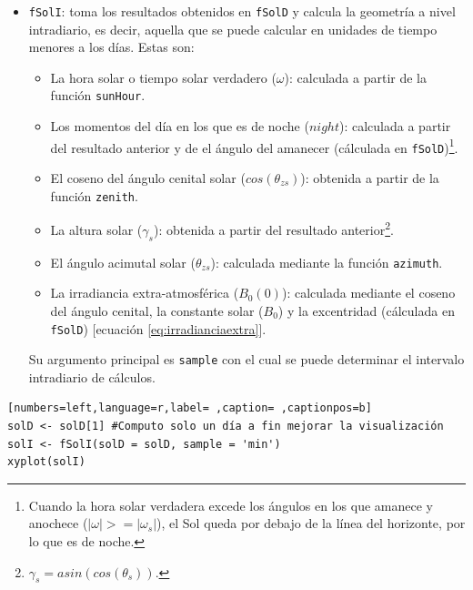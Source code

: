 \begin{itemize}
\item \texttt{fSolI}: toma los resultados obtenidos en \texttt{fSolD} y calcula la geometría a nivel intradiario, es decir, aquella que se puede calcular en unidades de tiempo menores a los días.
Estas son:
\begin{itemize}
\item La hora solar o tiempo solar verdadero (\(\omega\)): calculada a partir de la función \texttt{sunHour}.
\item Los momentos del día en los que es de noche (\(night\)): calculada a partir del resultado anterior y de el ángulo del amanecer (cálculada en \texttt{fSolD})\footnote{Cuando la hora solar verdadera excede los ángulos en los que amanece y anochece (\(|\omega|>=|\omega_s|\)), el Sol queda por debajo de la línea del horizonte, por lo que es de noche.}.
\item El coseno del ángulo cenital solar (\(cos(\theta_{zs})\)): obtenida a partir de la función \texttt{zenith}.
\item La altura solar (\(\gamma_s\)): obtenida a partir del resultado anterior\footnote{\(\gamma_s=asin(cos(\theta_s))\).}.
\item El ángulo acimutal solar (\(\theta_{zs}\)): calculada mediante la función \texttt{azimuth}.
\item La irradiancia extra-atmosférica (\(B_0(0)\)): calculada mediante el coseno del ángulo cenital, la constante solar (\(B_0\)) y la excentridad (cálculada en \texttt{fSolD}) [ecuación \ref{eq:irradianciaextra}].
\end{itemize}
Su argumento principal es \texttt{sample} con el cual se puede determinar el intervalo intradiario de cálculos.
\end{itemize}
\begin{lstlisting}[numbers=left,language=r,label= ,caption= ,captionpos=b]
solD <- solD[1] #Computo solo un día a fin mejorar la visualización
solI <- fSolI(solD = solD, sample = 'min') 
xyplot(solI)
\end{lstlisting}

